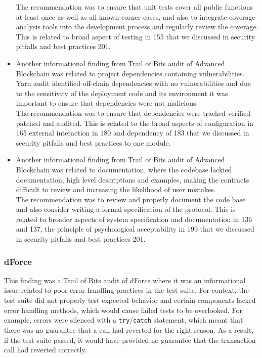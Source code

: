 \begin{itemize}
  The recommendation was to ensure that unit tests cover all public
  functions at least once as well as all known corner cases, and also to
  integrate coverage analysis tools into the development process and
  regularly review the coverage. This is related to broad aspect of
  testing in 155 that we discussed in security pitfalls and best
  practices 201.
\item
  Another informational finding from Trail of Bits audit of Advanced
  Blockchain was related to project dependencies containing
  vulnerabilities. Yarn audit identified off-chain dependencies with no
  vulnerabilities and due to the sensitivity of the deployment code and
  its environment it was important to ensure that dependencies were not
  malicious.\\

  The recommendation was to ensure that dependencies were tracked
  verified patched and audited. This is related to the broad aspects of
  configuration in 165 external interaction in 180 and dependency of 183
  that we discussed in security pitfalls and best practices to one
  module.
\item
  Another informational finding from Trail of Bits audit of Advanced
  Blockchain was related to documentation, where the codebase lackied
  documentation, high level descriptions and examples, making the
  contracts difficult to review and increasing the likelihood of user
  mistakes.\\

  The recommendation was to review and properly document the code base
  and also consider writing a formal specification of the protocol. This
  is related to broader aspects of system specification and
  documentation in 136 and 137, the principle of psychological
  acceptability in 199 that we discussed in security pitfalls and best
  practices 201.
\end{itemize}

\subsubsection{dForce}\label{dforce}

This finding was a Trail of Bits audit of dForce where it was an
informational issue related to poor error handling practices in the test
suite. For context, the test suite did not properly test expected
behavior and certain components lacked error handling methods, which
would cause failed tests to be overlooked. For example, errors were
silenced with a \texttt{try}/\texttt{catch} statement, which meant that
there was no guarantee that a call had reverted for the right reason. As
a result, if the test suite passed, it would have provided no guarantee
that the transaction call had reverted correctly.

